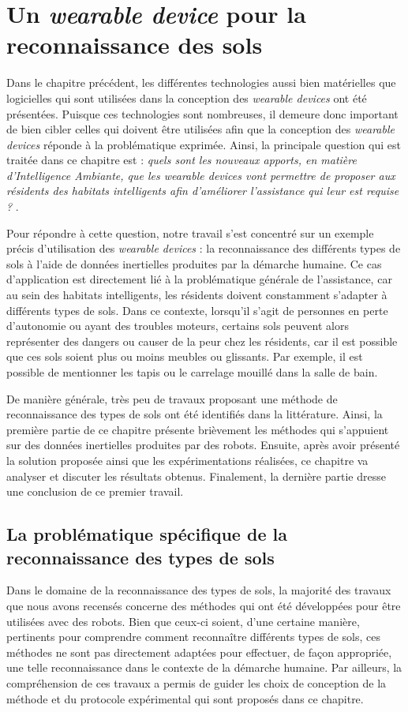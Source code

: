 \chapter{Un \textit{wearable device} pour la reconnaissance des sols}
\label{chap:4}

Dans le chapitre précédent, les différentes technologies aussi bien matérielles que logicielles qui sont utilisées dans la conception des \textit{wearable devices} ont été présentées. Puisque ces technologies sont nombreuses, il demeure donc important de bien cibler celles qui doivent être utilisées afin que la conception des \textit{wearable devices} réponde à la problématique exprimée. Ainsi, la principale question qui est traitée dans ce chapitre est : \textit{\og quels sont les nouveaux apports, en matière d'Intelligence Ambiante, que les wearable devices vont permettre de proposer aux résidents des habitats intelligents afin d'améliorer l'assistance qui leur est requise ? \fg}.

Pour répondre à cette question, notre travail s'est concentré sur un exemple précis d'utilisation des \textit{wearable devices} : la reconnaissance des différents types de sols à l'aide de données inertielles produites par la démarche humaine. Ce cas d'application est directement lié à la problématique générale de l'assistance, car au sein des habitats intelligents, les résidents doivent constamment s'adapter à différents types de sols. Dans ce contexte, lorsqu'il s'agit de personnes en perte d'autonomie ou ayant des troubles moteurs, certains sols peuvent alors représenter des dangers ou causer de la peur chez les résidents, car il est possible que ces sols soient plus ou moins meubles ou glissants. Par exemple, il est possible de mentionner les tapis ou le carrelage mouillé dans la salle de bain.

De manière générale, très peu de travaux proposant une méthode de reconnaissance des types de sols ont été identifiés dans la littérature. Ainsi, la première partie de ce chapitre présente brièvement les méthodes qui s'appuient sur des données inertielles produites par des robots. Ensuite, après avoir présenté la solution proposée ainsi que les expérimentations réalisées, ce chapitre va analyser et discuter les résultats obtenus. Finalement, la dernière partie dresse une conclusion de ce premier travail.

\section{La problématique spécifique de la reconnaissance des types de sols}
\label{sec:rw}
Dans le domaine de la reconnaissance des types de sols, la majorité des travaux que nous avons recensés concerne des méthodes qui ont été développées pour être utilisées avec des robots. Bien que ceux-ci soient, d'une certaine manière, pertinents pour comprendre comment reconnaître différents types de sols, ces méthodes ne sont pas directement adaptées pour effectuer, de façon appropriée, une telle reconnaissance dans le contexte de la démarche humaine. Par ailleurs, la compréhension de ces travaux a permis de guider les choix de conception de la méthode et du protocole expérimental qui sont proposés dans ce chapitre.

